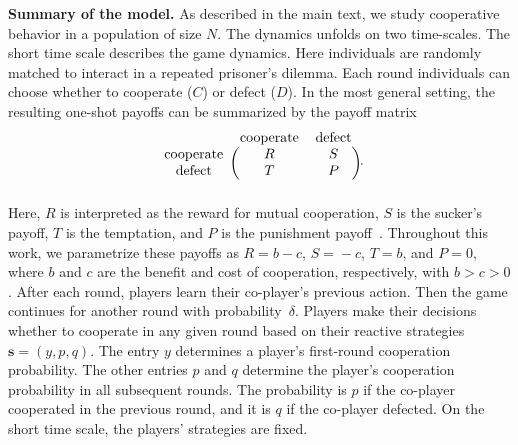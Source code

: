 \documentclass[11pt]{article}
\theoremstyle{plainCl1}
\theoremstyle{plainCl2}
\begin{document}
\noindent
{\bf Summary of the model.} As described in the main text, we study cooperative behavior in a population of size $N$.
The dynamics unfolds on two time-scales. 
The short time scale describes the game dynamics. 
Here individuals are randomly matched to interact in a repeated prisoner's dilemma.  
Each round individuals can choose whether to cooperate ($C$) or defect ($D$). 
In the most general setting, the resulting one-shot payoffs can be summarized by the payoff matrix 
\begin{equation}\label{eq:prisoner}
    \begin{blockarray}{ccc}
        & \text{cooperate} & \text{defect} \\
        \begin{block}{c(cc)}
            \text{cooperate} & R & S \\
            \text{defect} & T & P \\
        \end{block}
    \end{blockarray}.
\end{equation}
Here, $R$ is interpreted as the reward for mutual cooperation, $S$ is the sucker's payoff, $T$ is the temptation, and $P$ is the punishment payoff~\citep{axelrod1981evolution}. 
Throughout this work, we parametrize these payoffs as $R\!=\!b\!-\!c$, $S\!=\!-c$, $T\!=\!b$, and $P\!=\!0$, where $b$ and $c$ are the benefit and cost of cooperation, respectively, with $b\!>\!c\!>0$. 
After each round, players learn their co-player's previous action. 
Then the game continues for another round with probability~$\delta$.
Players make their decisions whether to cooperate in any given round based on their reactive strategies $\mathbf{s}\!=\!(y,p,q)$. 
The entry $y$ determines a player's first-round cooperation probability. 
The other entries $p$ and $q$ determine the player's cooperation probability in all subsequent rounds. 
The probability is $p$ if the co-player cooperated in the previous round, and it is $q$ if the co-player defected. 
On the short time scale, the players' strategies are fixed. 

\end{document}
